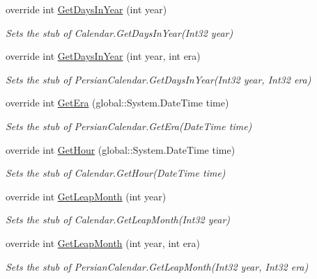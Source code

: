 \begin{DoxyCompactItemize}
override int \hyperlink{class_system_1_1_globalization_1_1_fakes_1_1_stub_persian_calendar_a7fe405f700fe5809d8824d728046cf94}{Get\-Days\-In\-Year} (int year)
\begin{DoxyCompactList}\small\item\em Sets the stub of Calendar.\-Get\-Days\-In\-Year(\-Int32 year)\end{DoxyCompactList}\item 
override int \hyperlink{class_system_1_1_globalization_1_1_fakes_1_1_stub_persian_calendar_ab11d9ca6e66e315ee77937887de3eadb}{Get\-Days\-In\-Year} (int year, int era)
\begin{DoxyCompactList}\small\item\em Sets the stub of Persian\-Calendar.\-Get\-Days\-In\-Year(\-Int32 year, Int32 era)\end{DoxyCompactList}\item 
override int \hyperlink{class_system_1_1_globalization_1_1_fakes_1_1_stub_persian_calendar_a723f01bd51b00c72ffc0947635698891}{Get\-Era} (global\-::\-System.\-Date\-Time time)
\begin{DoxyCompactList}\small\item\em Sets the stub of Persian\-Calendar.\-Get\-Era(\-Date\-Time time)\end{DoxyCompactList}\item 
override int \hyperlink{class_system_1_1_globalization_1_1_fakes_1_1_stub_persian_calendar_a447fea612fed50191366f6e1dd9ffa5b}{Get\-Hour} (global\-::\-System.\-Date\-Time time)
\begin{DoxyCompactList}\small\item\em Sets the stub of Calendar.\-Get\-Hour(\-Date\-Time time)\end{DoxyCompactList}\item 
override int \hyperlink{class_system_1_1_globalization_1_1_fakes_1_1_stub_persian_calendar_a6b588c393ce88fb91f866d285b0bd2f1}{Get\-Leap\-Month} (int year)
\begin{DoxyCompactList}\small\item\em Sets the stub of Calendar.\-Get\-Leap\-Month(\-Int32 year)\end{DoxyCompactList}\item 
override int \hyperlink{class_system_1_1_globalization_1_1_fakes_1_1_stub_persian_calendar_addd6cff2c3625e351bd6fb94882625d6}{Get\-Leap\-Month} (int year, int era)
\begin{DoxyCompactList}\small\item\em Sets the stub of Persian\-Calendar.\-Get\-Leap\-Month(\-Int32 year, Int32 era)\end{DoxyCompactList}\item 

\end{DoxyCompactItemize}
